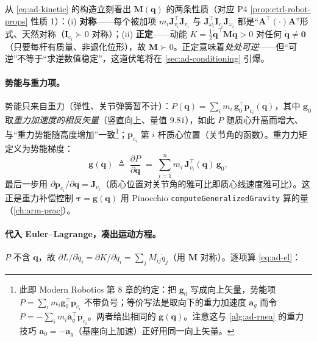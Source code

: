\begin{insight}[质量阵的两个性质从这里就读得出]
\label{ins:ad-M-spd}
从 \cref{eq:ad-kinetic} 的构造立刻看出 $\mathbf{M}(\mathbf{q})$ 的两条性质（对应 P4 \cref{prop:ctrl-robot-props} 性质 1）：(i) \textbf{对称}——每个被加项 $m_i\mathbf{J}_{v_i}^\top\mathbf{J}_{v_i}$ 与 $\mathbf{J}_{\omega_i}^\top\mathbf{I}_{c_i}\mathbf{J}_{\omega_i}$ 都是“$\mathbf{A}^\top(\cdot)\mathbf{A}$”形式、天然对称（$\mathbf{I}_{c_i}\succ0$ 对称）；(ii) \textbf{正定}——动能 $K=\tfrac12\dot{\mathbf{q}}^\top\mathbf{M}\dot{\mathbf{q}}>0$ 对任何 $\dot{\mathbf{q}}\neq\mathbf{0}$（只要每杆有质量、非退化位形），故 $\mathbf{M}\succ0$。正定意味着\emph{处处可逆}——但“可逆”不等于“求逆数值稳定”，这道伏笔将在 \cref{sec:ad-conditioning} 引爆。
\end{insight}

\paragraph{势能与重力项。}
势能只来自重力（弹性、关节弹簧暂不计）：$P(\mathbf{q})=\sum_i m_i\,\mathbf{g}_0^\top\mathbf{p}_{c_i}(\mathbf{q})$，其中 $\mathbf{g}_0$ 取\emph{重力加速度的相反矢量}（竖直向上、量值 $9.81$），如此 $P$ 随质心升高而增大、与“重力势能随高度增加”一致\footnote{此即 Modern Robotics \cite{lynch2017modern} 第 8 章的约定：把 $\mathbf{g}_0$ 写成向上矢量，势能项 $P=\sum_i m_i\mathbf{g}_0^\top\mathbf{p}_{c_i}$ 不带负号；等价写法是取向下的重力加速度 $\mathbf{a}_g$ 而令 $P=-\sum_i m_i\mathbf{a}_g^\top\mathbf{p}_{c_i}$。两者给出相同的 $\mathbf{g}(\mathbf{q})$。注意这与 \cref{alg:ad-rnea} 的重力技巧 $\mathbf{a}_0=-\mathbf{a}_g$（基座向上加速）正好用同一向上矢量。}；$\mathbf{p}_{c_i}$ 第 $i$ 杆质心位置（关节角的函数）。重力力矩定义为势能梯度：
\begin{equation}
  \mathbf{g}(\mathbf{q})\;\triangleq\;\frac{\partial P}{\partial\mathbf{q}}\;=\;\sum_{i=1}^n m_i\,\mathbf{J}_{v_i}^\top(\mathbf{q})\,\mathbf{g}_0,
  \label{eq:ad-gravity}
\end{equation}
最后一步用 $\partial\mathbf{p}_{c_i}/\partial\mathbf{q}=\mathbf{J}_{v_i}$（质心位置对关节角的雅可比即质心线速度雅可比）。这正是重力补偿控制 $\boldsymbol{\tau}=\mathbf{g}(\mathbf{q})$ 用 Pinocchio \texttt{computeGeneralizedGravity} 算的量（\cref{ch:arm-prac}）。

\paragraph{代入 Euler--Lagrange，凑出运动方程。}
$P$ 不含 $\dot{\mathbf{q}}$，故 $\partial L/\partial\dot{q}_i=\partial K/\partial\dot{q}_i=\sum_j M_{ij}\dot{q}_j$（用 $\mathbf{M}$ 对称）。逐项算 \cref{eq:ad-el}：

